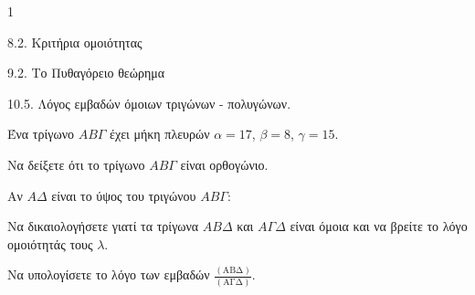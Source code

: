 \begin{ylh}{1}
    \item 8.2. Κριτήρια ομοιότητας
    \item 9.2. Το Πυθαγόρειο θεώρημα
    \item 10.5. Λόγος εμβαδών όμοιων τριγώνων - πολυγώνων.
\end{ylh}
Ένα τρίγωνο $AB\Gamma$ έχει μήκη πλευρών $\alpha = 17$, $\beta = 8$, $\gamma = 15$.
\begin{alist}
\item Να δείξετε ότι το τρίγωνο $AB\Gamma$ είναι ορθογώνιο. 
\item Αν $A\Delta$ είναι το ύψος του τριγώνου $AB\Gamma$:
    \begin{rlist}
    \item Να δικαιολογήσετε γιατί τα τρίγωνα $AB\Delta$ και $A\Gamma\Delta$ είναι όμοια και να βρείτε το λόγο ομοιότητάς τους $\lambda$.
    \item Να υπολογίσετε το λόγο των εμβαδών $\frac{(\text{ΑΒΔ})}{(\text{ΑΓΔ})}$. 
    \end{rlist}
\end{alist}